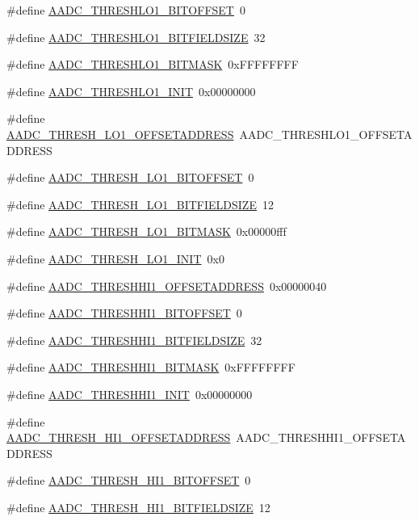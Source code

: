 \begin{DoxyCompactItemize}
\item 
\#define \hyperlink{a00543_ab2174fc6f4612ce3f793ef9b810dac05}{AADC\_\-THRESHLO1\_\-BITOFFSET}~0
\item 
\#define \hyperlink{a00543_aa142535ad737256919286f1dd51f079b}{AADC\_\-THRESHLO1\_\-BITFIELDSIZE}~32
\item 
\#define \hyperlink{a00543_a2fb19361679f8771135d7d23a814fe4b}{AADC\_\-THRESHLO1\_\-BITMASK}~0xFFFFFFFF
\item 
\#define \hyperlink{a00543_abb78a3197040e4bcdfb5fa53e4a01c49}{AADC\_\-THRESHLO1\_\-INIT}~0x00000000
\item 
\#define \hyperlink{a00543_ad6f238270309b20c7217b05d7562b737}{AADC\_\-THRESH\_\-LO1\_\-OFFSETADDRESS}~AADC\_\-THRESHLO1\_\-OFFSETADDRESS
\item 
\#define \hyperlink{a00543_a2047d96b41d72252be59b5281fe0f90e}{AADC\_\-THRESH\_\-LO1\_\-BITOFFSET}~0
\item 
\#define \hyperlink{a00543_abe8703e96f981ef21b521812c7948528}{AADC\_\-THRESH\_\-LO1\_\-BITFIELDSIZE}~12
\item 
\#define \hyperlink{a00543_a9a687ae4109f8657984cb12970ce0dfd}{AADC\_\-THRESH\_\-LO1\_\-BITMASK}~0x00000fff
\item 
\#define \hyperlink{a00543_a83d7e3e3ece971a4f0262abda992a483}{AADC\_\-THRESH\_\-LO1\_\-INIT}~0x0
\item 
\#define \hyperlink{a00543_a17cff8ced56b3d7fe00645f3fddfff67}{AADC\_\-THRESHHI1\_\-OFFSETADDRESS}~0x00000040
\item 
\#define \hyperlink{a00543_ab179fb56f331deeddf0ecf3841457ed6}{AADC\_\-THRESHHI1\_\-BITOFFSET}~0
\item 
\#define \hyperlink{a00543_a2f119626d684c5a73c7c9bc02b39d7cd}{AADC\_\-THRESHHI1\_\-BITFIELDSIZE}~32
\item 
\#define \hyperlink{a00543_ada57d438e762e8d96c76714b39cc21cc}{AADC\_\-THRESHHI1\_\-BITMASK}~0xFFFFFFFF
\item 
\#define \hyperlink{a00543_ae593b4b6d741b89d6ab14e6fc51034a4}{AADC\_\-THRESHHI1\_\-INIT}~0x00000000
\item 
\#define \hyperlink{a00543_adc4a6b0ffdc1fe0762d354e7dc133ca3}{AADC\_\-THRESH\_\-HI1\_\-OFFSETADDRESS}~AADC\_\-THRESHHI1\_\-OFFSETADDRESS
\item 
\#define \hyperlink{a00543_a30a95875850284a641e0484acdb5f748}{AADC\_\-THRESH\_\-HI1\_\-BITOFFSET}~0
\item 
\#define \hyperlink{a00543_a05a23cf59da0bfac3e3be785c978a924}{AADC\_\-THRESH\_\-HI1\_\-BITFIELDSIZE}~12
\item 

\end{DoxyCompactItemize}
